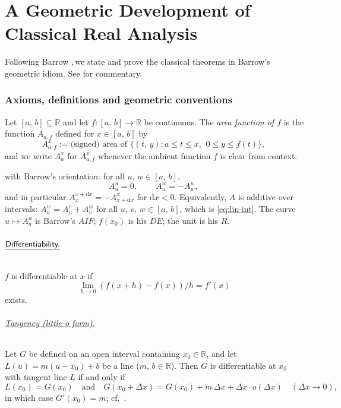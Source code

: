 \documentclass[11pt,reqno]{amsart}
\providecommand{\R}{\mathbb{R}}
\newcommand{\comma}{,\,\allowbreak}
\theoremstyle{redplain}
\begin{document}
\part{A Geometric Development of Classical Real Analysis}
\label{part:part1}
\noindent Following Barrow \cite[Lecture~X, \S 11]{Barrow1916}\comma we state and prove the classical theorems in Barrow's geometric idiom. See \cite{Lopez2026} for commentary.

\section{Axioms, definitions and geometric conventions}
\label{sec:conventions}

Let $[a\comma b]\subseteq\R$ and let $f\colon[a\comma b]\to\R$ be continuous. The \emph{area function of $f$} is the function $A_{a,f}$ defined for $x\in[a\comma b]$ by
\begin{equation}\label{eq:area}
A_{a,f}^{x}:=\text{(signed) area of }\{(t\comma y): a\le t\le x\comma\ 0\le y\le f(t)\}\comma
\end{equation}
and we write $A_a^x$ for $A_{a,f}^x$ whenever the ambient function $f$ is clear from context.

with Barrow's orientation: for all $u\comma w\in[a\comma b]$,
\begin{equation}\label{eq:oriented-area}
A_u^{u}=0\comma\qquad A_u^{w}=-A_w^{u}\comma
\end{equation}
and in particular $A_x^{x+\mathrm{d}x}=-A_{x+\mathrm{d}x}^{x}$ for $\mathrm{d}x<0$. Equivalently, $A$ is additive over intervals: $A_u^w=A_u^v+A_v^w$ for all $u\comma v\comma w\in[a\comma b]$, which is \autoref{eq:lin-int}. The curve $u\mapsto A_a^u$ is Barrow's $AIF$; $f(x_0)$ is his $DE$; the unit is his $R$.

\paragraph{$\textsf{\underline{Differentiability.}}$}\text{\ } $f$ is differentiable at $x$ if
\begin{equation}\label{eq:diff}
\lim_{h\to 0}(f(x+h)-f(x))/h=f'(x)
\end{equation}
exists.

\paragraph{\textsf{\underline{Tangency (little-\textit{o} form).}}}
Let $G$ be defined on an open interval containing $x_0\in\R$, and let $L(u)=m(u-x_0)+b$ be a line ($m\comma b\in\R$). Then $G$ is differentiable at $x_0$ with tangent line $L$ if and only if
\begin{equation}\label{eq:little-o}
L(x_0)=G(x_0)\quad\text{and}\quad G(x_0+\Delta x)=G(x_0)+m\,\Delta x+\Delta x\cdot o(\Delta x)\quad(\Delta x\to0)\comma
\end{equation}
in which case $G'(x_0)=m$; cf.\ \cite[Theorem~2]{Lopez2026}.
\end{document}
